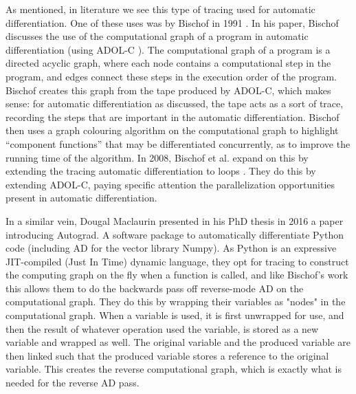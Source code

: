         As mentioned, in literature we see this type of tracing used for automatic differentiation.
        One of these uses was by Bischof in 1991 \cite{bischof1991issues}.
        In his paper, Bischof discusses the use of the computational graph of a program in automatic differentiation (using ADOL-C \cite{griewank1996algorithm}).
        The computational graph of a program is a directed acyclic graph, where each node contains a computational step in the program, and edges connect these steps in the execution order of the program.
        Bischof creates this graph from the tape produced by ADOL-C, which makes sense: for automatic differentiation as discussed, the tape acts as a sort of trace, recording the steps that are important in the automatic differentiation.
        Bischof then uses a graph colouring algorithm on the computational graph to highlight ``component functions'' that may be differentiated concurrently, as to improve the running time of the algorithm.
        In 2008, Bischof et al. expand on this by extending the tracing automatic differentiation to loops \cite{bischof2008parallel}.
        They do this by extending ADOL-C, paying specific attention the parallelization opportunities present in automatic differentiation.

        In a similar vein, Dougal Maclaurin presented in his PhD thesis in 2016 \cite{maclaurin2016modeling} a paper introducing Autograd.
        A software package to automatically differentiate Python code (including AD for the vector library Numpy).
        As Python is an expressive JIT-compiled (Just In Time) dynamic language, they opt for tracing to construct the computing graph on the fly when a function is called, and like Bischof's work this allows them to do the backwards pass off reverse-mode AD on the computational graph.
        They do this by wrapping their variables as "nodes" in the computational graph.
        When a variable is used, it is first unwrapped for use, and then the result of whatever operation used the variable, is stored as a new variable and wrapped as well.
        The original variable and the produced variable are then linked such that the produced variable stores a reference to the original variable.
        This creates the reverse computational graph, which is exactly what is needed for the reverse AD pass.

